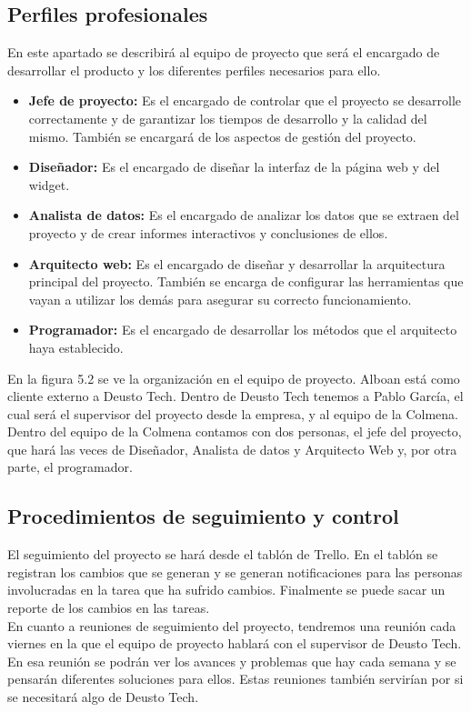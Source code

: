 
\subsection{Perfiles profesionales}

En este apartado se describirá al equipo de proyecto que será el encargado de desarrollar el producto y los diferentes perfiles necesarios para ello.

\begin{itemize}
	\item \textbf{Jefe de proyecto:} Es el encargado de controlar que el proyecto se desarrolle correctamente y de garantizar los tiempos de desarrollo y la calidad del mismo. También se encargará de los aspectos de gestión del proyecto.
	\item \textbf{Diseñador:} Es el encargado de diseñar la interfaz de la página web y del widget.
	\item \textbf{Analista de datos:} Es el encargado de analizar los datos que se extraen del proyecto y de crear informes interactivos y conclusiones de ellos.
	\item \textbf{Arquitecto web:} Es el encargado de diseñar y desarrollar la arquitectura principal del proyecto. También se encarga de configurar las herramientas que vayan a utilizar los demás para asegurar su correcto funcionamiento.
	\item \textbf{Programador:} Es el encargado de desarrollar los métodos que el arquitecto haya establecido.
\end{itemize}

En la figura 5.2 se ve la organización en el equipo de proyecto. Alboan está como cliente externo a Deusto Tech. Dentro de Deusto Tech tenemos a Pablo García, el cual será el supervisor del proyecto desde la empresa, y al equipo de la Colmena. Dentro del equipo de la Colmena contamos con dos personas, el jefe del proyecto, que hará las veces de Diseñador, Analista de datos y Arquitecto Web y, por otra parte, el programador.


\subsection{Procedimientos de seguimiento y control}

El seguimiento del proyecto se hará desde el tablón de Trello. En el tablón se registran los cambios que se generan y se generan notificaciones para las personas involucradas en la tarea que ha sufrido cambios. Finalmente se puede sacar un reporte de los cambios en las tareas.\\

En cuanto a reuniones de seguimiento del proyecto, tendremos una reunión cada viernes en la que el equipo de proyecto hablará con el supervisor de Deusto Tech. En esa reunión se podrán ver los avances y problemas que hay cada semana y se pensarán diferentes soluciones para ellos. Estas reuniones también servirían por si se necesitará algo de Deusto Tech.
